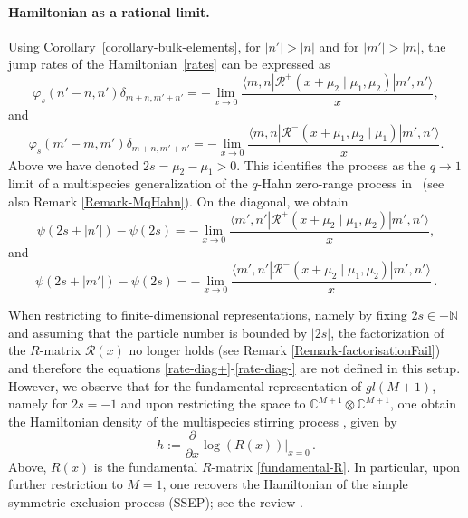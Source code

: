 \documentclass[11pt]{article}
\numberwithin{equation}{section}
\newcommand{\M}{M}
\newcommand{\eR}{\mathcal{R}}
\newcommand{\fundR}{R}
\begin{document}
 \paragraph{Hamiltonian as a rational limit.}
    
    Using Corollary~\ref{corollary-bulk-elements}, for $|n'|>|n|$ and for $|m'|>|m|$, the jump rates of the Hamiltonian~\eqref{rates} can be expressed as 
    \begin{equation}\label{rate+}
        \varphi_{s}(n'-n,n')\delta_{m+n,m'+n'}
        = -\lim_{x\to 0}
        \frac{\langle m,n|\eR^{+}(x+\mu_{2}\mid \mu_{1},\mu_{2})|m',n'\rangle}{x},
    \end{equation}
    and
    \begin{equation}\label{rate-}
        \varphi_{s}(m'-m,m')\delta_{m+n,m'+n'}
        =- \lim_{x\to 0}
        \frac{\langle m,n|\eR^{-}(x+\mu_{1},\mu_{2}\mid \mu_{1})|m',n'\rangle}{x}.
    \end{equation}
    Above we have denoted $2s=\mu_{2}-\mu_{1}>0$.   This identifies the process as the $q\to 1$ limit of a multispecies generalization of the $q$-Hahn zero-range process in~\cite{sasamoto1998one,barraquand2016q} (see also Remark \ref{Remark-MqHahn}).
    On the diagonal, we obtain 
\begin{equation}\label{rate-diag+}
        \psi(2s+|n'|)-\psi(2s)
        = -\lim_{x\to 0}
        \frac{\langle m',n'|\eR^{+}(x+\mu_{2}\mid \mu_{1},\mu_{2})|m',n'\rangle}{x},
    \end{equation}
    and 
    \begin{equation}\label{rate-diag-}
        \psi(2s+|m'|)-\psi(2s)
        = -\lim_{x\to 0}
        \frac{\langle m',n'|\eR^{-}(x+\mu_{2}\mid \mu_{1},\mu_{2})|m',n'\rangle}{x}\,.
    \end{equation}
          
	When restricting to finite-dimensional representations, namely by fixing $2s\in -\mathbb{N}$ and assuming that the particle number is bounded by $|2s|$, the factorization of the $R$-matrix $\eR(x)$ no longer holds (see Remark \ref{Remark-factorisationFail}) and therefore the equations \eqref{rate-diag+}-\eqref{rate-diag-} are not defined in this setup. However, we observe that for the fundamental representation of $gl(\M+1)$, namely for $2s = -1$ and upon restricting the space to $\mathbb{C}^{\M+1} \otimes \mathbb{C}^{\M+1}$, one obtain the Hamiltonian density of the multispecies stirring process \cite{vanicat2017exact, casini2024duality}, given by
\begin{equation}\label{Mstirring-hamiltonian}
    h := \frac{\partial}{\partial x} \log\!\left(\fundR(x)\right)\bigg|_{x=0}\,.
\end{equation}
Above, $\fundR(x)$ is the fundamental $R$-matrix \eqref{fundamental-R}. In particular, upon further restriction to $M=1$, one recovers the Hamiltonian of the simple symmetric exclusion process (SSEP); see the review \cite{crampe2014integrable}.
\end{document}

